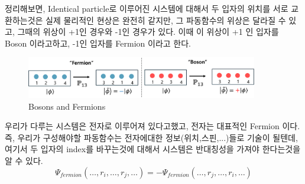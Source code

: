 \documentclass[11pt]{article}
\begin{document}
정리해보면, Identical particle로 이루어진 시스템에 대해서 두 입자의 위치를 서로 교환하는것은 실제 물리적인 현상은 완전히 같지만, 그 파동함수의 위상은 달라질 수 있고, 
그때의 위상이 +1인 경우와 -1인 경우가 있다. 
이때 이 위상이 +1 인 입자를 Boson 이라고하고, -1인 입자를 Fermion 이라고 한다. 

\begin{figure}[htbp]
  \centering
  \includegraphics[width=0.9\textwidth]{fig/idet3.png}
  \caption{Bosons and Fermions}
  \label{fig:example2}
\end{figure}

우리가 다루는 시스템은 전자로 이루어져 있다고했고, 전자는 대표적인 Fermion 이다. 
즉, 우리가 구성해야할 파동함수는 전자에대한 정보(위치,스핀,...)들로 기술이 될텐데, 여기서 두 입자의 index를 바꾸는것에 대해서 시스템은 반대칭성을 가져야 한다는것을 알 수 있다. 
\[
\Psi_{fermion}(\dots, r_i, \dots, r_j, \dots) = -\Psi_{fermion}(\dots, r_j, \dots, r_i, \dots)
\]
\end{document}
